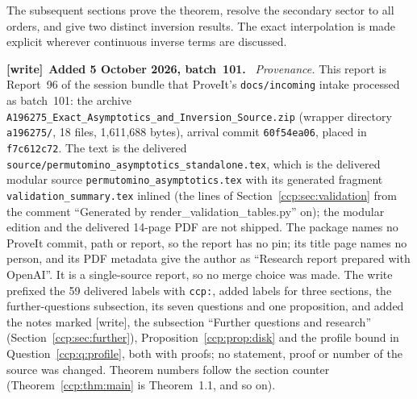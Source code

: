 \documentclass[11pt,letterpaper]{article}
\theoremstyle{remark}\newtheorem{remark}[theorem]{Remark}
\newenvironment{writenote}[1][]{\par\smallskip\begingroup\small
 \noindent\textbf{[write]}\if\relax\detokenize{#1}\relax\else~\textbf{#1.}\fi\ }%
 {\par\endgroup\smallskip}
\begin{document}
The subsequent sections prove the theorem, resolve the secondary sector to all orders, and give two distinct inversion results. The exact interpolation is made explicit wherever continuous inverse terms are discussed.

\begin{writenote}[Added 5 October 2026, batch~101]
\emph{Provenance.} This report is Report~96 of the session bundle that
ProveIt's \nolinkurl{docs/incoming} intake processed as batch~101: the
archive \nolinkurl{A196275_Exact_Asymptotics_and_Inversion_Source.zip}
(wrapper directory \nolinkurl{a196275/}, 18 files, 1{,}611{,}688 bytes),
arrival commit \nolinkurl{60f54ea06}, placed in \nolinkurl{f7c612c72}. The
text is the delivered \nolinkurl{source/permutomino_asymptotics_standalone.tex},
which is the delivered modular source \nolinkurl{permutomino_asymptotics.tex}
with its generated fragment \nolinkurl{validation_summary.tex} inlined (the
lines of Section~\ref{ccp:sec:validation} from the comment ``Generated by
render\_validation\_tables.py'' on); the modular edition and the delivered
14-page PDF are not shipped. The package names no ProveIt commit, path or
report, so the report has no pin; its title page names no person, and its
PDF metadata give the author as ``Research report prepared with OpenAI''.
It is a single-source report, so no merge choice was made. The write
prefixed the 59 delivered labels with \nolinkurl{ccp:}, added labels for
three sections, the further-questions subsection, its seven questions and
one proposition, and added the notes marked [write], the subsection
``Further questions and research'' (Section~\ref{ccp:sec:further}),
Proposition~\ref{ccp:prop:disk} and the profile bound in
Question~\ref{ccp:q:profile}, both with proofs; no statement, proof or
number of the source was changed. Theorem numbers follow the section counter
(Theorem~\ref{ccp:thm:main} is Theorem~1.1, and so on).


\end{writenote}
\end{document}
